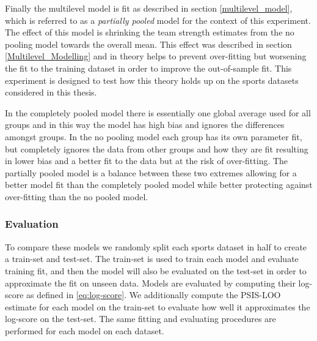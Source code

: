 Finally the multilevel model is fit as described in section \ref{multilevel_model}, which is referred to as a \textit{partially pooled} model for the context of this experiment. The effect of this model is shrinking the team strength estimates from the no pooling model towards the overall mean. This effect was described in section \ref{Multilevel_Modelling} and in theory helps to prevent over-fitting but worsening the fit to the training dataset in order to improve the out-of-sample fit. This experiment is designed to test how this theory holds up on the sports datasets considered in this thesis.

In the completely pooled model there is essentially one global average used for all groups and in this way the model has high bias and ignores the differences amongst groups. In the no pooling model each group has its own parameter fit, but completely ignores the data from other groups and how they are fit resulting in lower bias and a better fit to the data but at the risk of over-fitting. The partially pooled model is a balance between these two extremes allowing for a better model fit than the completely pooled model while better protecting against over-fitting than the no pooled model.

\subsubsection*{Evaluation}

To compare these models we randomly split each sports dataset in half to create a train-set and test-set. The train-set is used to train each model and evaluate training fit, and then the model will also be evaluated on the test-set in order to approximate the fit on unseen data. Models are evaluated by computing their log-score as defined in \ref{eq:log-score}. We additionally compute the PSIS-LOO estimate for each model on the train-set to evaluate how well it approximates the log-score on the test-set. The same fitting and evaluating procedures are performed for each model on each dataset.

